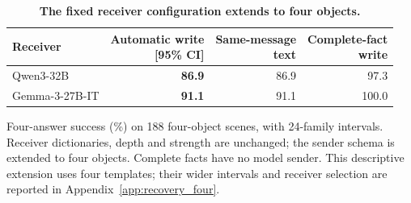 \begin{table}[!htbp]
\caption{\textbf{The fixed receiver configuration extends to four objects.}}
\label{tab:recovery_four}
\centering\small
\setlength{\tabcolsep}{3pt}\renewcommand{\arraystretch}{1.08}
\begin{tabular*}{\linewidth}{@{\extracolsep{\fill}}lrrr@{}}
\toprule
Receiver & \shortstack[r]{Automatic write\\{[95\% CI]}} & \shortstack[r]{Same-message\\text} & \shortstack[r]{Complete-fact\\write} \\
\midrule
Qwen3-32B & \textbf{86.9}\enspace {\footnotesize [78.0, 94.6]} & 86.9 & 97.3 \\
Gemma-3-27B-IT & \textbf{91.1}\enspace {\footnotesize [83.3, 97.9]} & 91.1 & 100.0 \\
\bottomrule
\end{tabular*}
\par\vspace{3pt}
{\footnotesize\raggedright Four-answer success (\%) on 188 four-object scenes, with 24-family intervals. Receiver dictionaries, depth and strength are unchanged; the sender schema is extended to four objects. Complete facts have no model sender. This descriptive extension uses four templates; their wider intervals and receiver selection are reported in Appendix~\ref{app:recovery_four}.\par}
\end{table}
